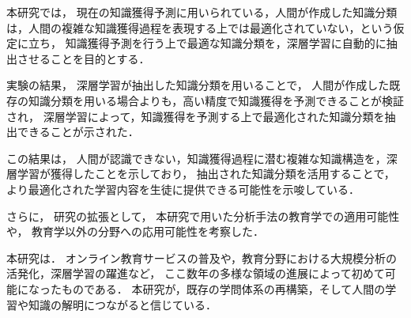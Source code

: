 本研究では，
現在の知識獲得予測に用いられている，人間が作成した知識分類は，人間の複雑な知識獲得過程を表現する上では最適化されていない，という仮定に立ち，
知識獲得予測を行う上で最適な知識分類を，深層学習に自動的に抽出させることを目的とする．

実験の結果，
深層学習が抽出した知識分類を用いることで，
人間が作成した既存の知識分類を用いる場合よりも，高い精度で知識獲得を予測できることが検証され，
深層学習によって，知識獲得を予測する上で最適化された知識分類を抽出できることが示された．

この結果は，
人間が認識できない，知識獲得過程に潜む複雑な知識構造を，深層学習が獲得したことを示しており，
抽出された知識分類を活用することで，より最適化された学習内容を生徒に提供できる可能性を示唆している．

さらに，
研究の拡張として，
本研究で用いた分析手法の教育学での適用可能性や，
教育学以外の分野への応用可能性を考察した．


本研究は．
オンライン教育サービスの普及や，教育分野における大規模分析の活発化，深層学習の躍進など，
ここ数年の多様な領域の進展によって初めて可能になったものである．
本研究が，既存の学問体系の再構築，そして人間の学習や知識の解明につながると信じている．
